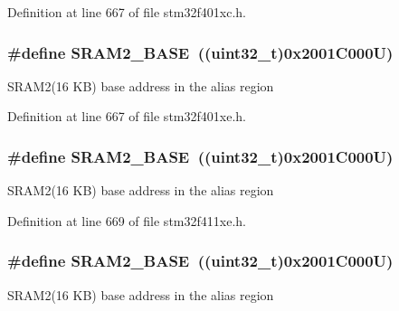 Definition at line 667 of file stm32f401xc.\+h.

\subsubsection[{\texorpdfstring{S\+R\+A\+M2\+\_\+\+B\+A\+SE}{SRAM2_BASE}}]{\setlength{\rightskip}{0pt plus 5cm}\#define S\+R\+A\+M2\+\_\+\+B\+A\+SE~((uint32\+\_\+t)0x2001\+C000\+U)}\hypertarget{group___peripheral__registers__structures_gadbb42a3d0a8a90a79d2146e4014241b1}{}\label{group___peripheral__registers__structures_gadbb42a3d0a8a90a79d2146e4014241b1}
S\+R\+A\+M2(16 K\+B) base address in the alias region 

Definition at line 667 of file stm32f401xe.\+h.

\subsubsection[{\texorpdfstring{S\+R\+A\+M2\+\_\+\+B\+A\+SE}{SRAM2_BASE}}]{\setlength{\rightskip}{0pt plus 5cm}\#define S\+R\+A\+M2\+\_\+\+B\+A\+SE~((uint32\+\_\+t)0x2001\+C000\+U)}\hypertarget{group___peripheral__registers__structures_gadbb42a3d0a8a90a79d2146e4014241b1}{}\label{group___peripheral__registers__structures_gadbb42a3d0a8a90a79d2146e4014241b1}
S\+R\+A\+M2(16 K\+B) base address in the alias region 

Definition at line 669 of file stm32f411xe.\+h.

\subsubsection[{\texorpdfstring{S\+R\+A\+M2\+\_\+\+B\+A\+SE}{SRAM2_BASE}}]{\setlength{\rightskip}{0pt plus 5cm}\#define S\+R\+A\+M2\+\_\+\+B\+A\+SE~((uint32\+\_\+t)0x2001\+C000\+U)}\hypertarget{group___peripheral__registers__structures_gadbb42a3d0a8a90a79d2146e4014241b1}{}\label{group___peripheral__registers__structures_gadbb42a3d0a8a90a79d2146e4014241b1}
S\+R\+A\+M2(16 K\+B) base address in the alias region 

